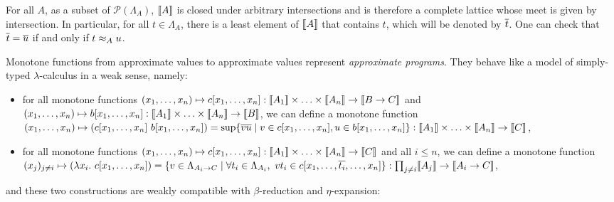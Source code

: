 For all $A$, as a subset of $\mathcal{P}(\Lambda_A)$, $\llbracket A \rrbracket$ is closed under arbitrary intersections and is therefore a complete lattice whose meet is given by intersection. In particular, for all $t\in\Lambda_A$, there is a least element of $\llbracket A \rrbracket$ that contains $t$, which will be denoted by $\overline{t}$. 
One can check that $\overline{t} = \overline{u}$ if and only if $t\approx_{A} u$.

Monotone functions from approximate values to approximate values represent \emph{approximate programs}. They behave like a model of simply-typed $\lambda$-calculus in a weak sense, namely: \begin{itemize}
\item for all monotone functions $(x_1, \ldots, x_n) \mapsto c[x_1, \ldots, x_n] : \llbracket A_1 \rrbracket \times \ldots \times \llbracket A_n \rrbracket \to \llbracket B \to C \rrbracket$ and $(x_1, \ldots, x_n) \mapsto b[x_1, \ldots, x_n] : \llbracket A_1 \rrbracket \times \ldots \times \llbracket A_n \rrbracket \to \llbracket B \rrbracket$, we can define a monotone function $(x_1, \ldots, x_n) \mapsto (c[x_1, \ldots, x_n]~ b[x_1, \ldots, x_n]) = \sup\{\overline{vu} \mid v \in c[x_1, \ldots, x_n], u \in b[x_1, \ldots, x_n]\} : \llbracket A_1 \rrbracket \times \ldots \times \llbracket A_n \rrbracket \to \llbracket C \rrbracket$,
\item for all monotone functions $(x_1, \ldots, x_n) \mapsto c[x_1, \ldots, x_n] : \llbracket A_1 \rrbracket \times \ldots \times \llbracket A_n \rrbracket \to \llbracket C \rrbracket$ and all $i \leq n$, we can define a monotone function $(x_j)_{j \neq i} \mapsto (\lambda x_i.~ c[x_1, \ldots, x_n]) = \{ v \in \Lambda_{A_i \to C} \mid \forall t_i \in \Lambda_{A_i},~ v t_i \in c[x_1, \ldots, \overline{t_i}, \ldots, x_n] \} : \prod_{j \neq i} \llbracket A_j \rrbracket \to \llbracket A_i \to C \rrbracket$,
\end{itemize}
and these two constructions are weakly compatible with $\beta$-reduction and $\eta$-expansion:

